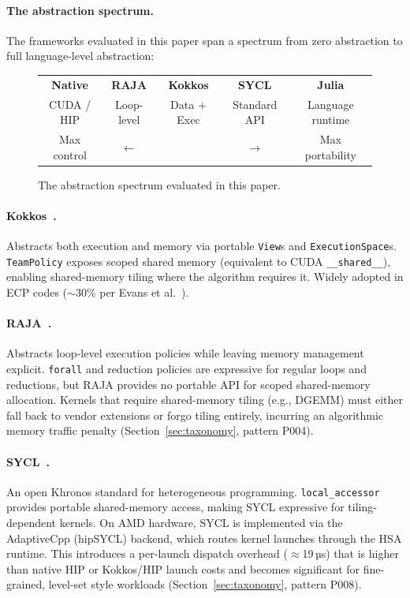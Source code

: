 \paragraph{The abstraction spectrum.}
The frameworks evaluated in this paper span a spectrum from zero abstraction
to full language-level abstraction:

\begin{figure}[h]
\centering
\begin{tabular}{ccccc}
\hline
\textbf{Native} & \textbf{RAJA} & \textbf{Kokkos} & \textbf{SYCL} &
\textbf{Julia} \\
CUDA / HIP & Loop-level & Data + Exec & Standard API & Language runtime \\
Max control & $\longleftarrow$ & & $\longrightarrow$ & Max portability \\
\hline
\end{tabular}
\caption{The abstraction spectrum evaluated in this paper.}
\label{fig:abstraction_spectrum}
\end{figure}

\paragraph{Kokkos~\cite{Carter2014}.}
Abstracts both execution and memory via portable \texttt{View}s and
\texttt{ExecutionSpace}s. \texttt{TeamPolicy} exposes scoped shared memory
(equivalent to CUDA \texttt{\_\_shared\_\_}), enabling shared-memory tiling
where the algorithm requires it. Widely adopted in ECP codes
($\sim$30\% per Evans et al.~\cite{Evans2022}).

\paragraph{RAJA~\cite{Hornung2014}.}
Abstracts loop-level execution policies while leaving memory management
explicit. \texttt{forall} and reduction policies are expressive for
regular loops and reductions, but RAJA provides no portable API for
scoped shared-memory allocation. Kernels that require shared-memory tiling
(e.g., DGEMM) must either fall back to vendor extensions or forgo tiling
entirely, incurring an algorithmic memory traffic penalty
(Section~\ref{sec:taxonomy}, pattern P004).

\paragraph{SYCL~\cite{Reyes2020}.}
An open Khronos standard for heterogeneous programming. \texttt{local\_accessor}
provides portable shared-memory access, making SYCL expressive for
tiling-dependent kernels. On AMD hardware, SYCL is implemented via the
AdaptiveCpp (hipSYCL) backend, which routes kernel launches through the
HSA runtime. This introduces a per-launch dispatch overhead ($\approx$19\,µs)
that is higher than native HIP or Kokkos/HIP launch costs and becomes
significant for fine-grained, level-set style workloads
(Section~\ref{sec:taxonomy}, pattern P008).

